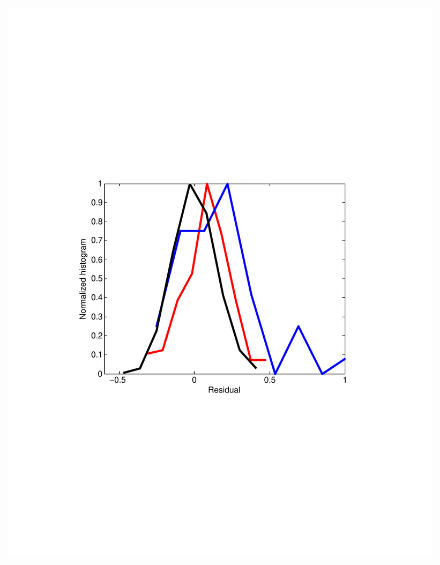 \begin{figure}
\centering
\begin{minipage}[c]{0.30\hsize}
\includegraphics[width=\hsize]{../figs/Figure10a_residuals_iidglm}
\end{minipage}
\begin{minipage}[c]{0.30\hsize}

\end{minipage}
\end{figure}
